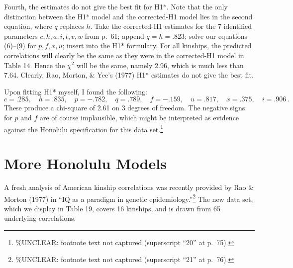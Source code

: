 ﻿\documentclass[12pt]{article}
\begin{document}
Fourth, the estimates do not give the best fit for H1*. Note that the only distinction between the H1* model and the corrected-H1 model lies in the second equation, where $q$ replaces $h$. Take the corrected-H1 estimates for the 7 identified parameters $c,h,a,i,t,v,w$ from p.\ 61; append $q=h=.823$; solve our equations (6)--(9) for $p,f,x,u$; insert into the H1* formulary. For all kinships, the predicted correlations will clearly be the same as they were in the corrected-H1 model in Table 14. Hence the $\chi^2$ will be the same, namely 2.96, which is much less than 7.64. Clearly, Rao, Morton, \& Yee's (1977) H1* estimates do not give the best fit.

Upon fitting H1* myself, I found the following:
\begin{equation*}
c=.285, \quad h=.835, \quad p=-.782, \quad q=.789, \quad f=-.159, \quad u=.817, \quad x=.375, \quad i=.906 \, .
\end{equation*}
These produce a chi-square of 2.61 on 3 degrees of freedom. The negative signs for $p$ and $f$ are of course implausible, which might be interpreted as evidence against the Honolulu specification for this data set.\footnote{\%UNCLEAR: footnote text not captured (superscript ``20'' at p.\ 75).}

\section{More Honolulu Models}

A fresh analysis of American kinship correlations was recently provided by Rao \& Morton (1977) in ``IQ as a paradigm in genetic epidemiology.''\footnote{\%UNCLEAR: footnote text not captured (superscript ``21'' at p.\ 76).} The new data set, which we display in Table 19, covers 16 kinships, and is drawn from 65 underlying correlations.
\end{document}

